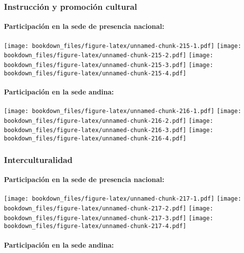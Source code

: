 \documentclass[]{article}
\let\oldparagraph\paragraph
\renewcommand{\paragraph}[1]{\oldparagraph{#1}\mbox{}}
\theoremstyle{definition}
\theoremstyle{definition}
\theoremstyle{definition}
\theoremstyle{remark}
\begin{document}
\subsubsection{Instrucción y promoción
cultural}\label{instruccion-y-promocion-cultural-1}

\paragraph{Participación en la sede de presencia
nacional:}\label{participacion-en-la-sede-de-presencia-nacional-24}

\texttt{[image: bookdown\_files/figure-latex/unnamed-chunk-215-1.pdf]}
\texttt{[image: bookdown\_files/figure-latex/unnamed-chunk-215-2.pdf]}
\texttt{[image: bookdown\_files/figure-latex/unnamed-chunk-215-3.pdf]}
\texttt{[image: bookdown\_files/figure-latex/unnamed-chunk-215-4.pdf]}

\paragraph{Participación en la sede
andina:}\label{participacion-en-la-sede-andina-24}

\texttt{[image: bookdown\_files/figure-latex/unnamed-chunk-216-1.pdf]}
\texttt{[image: bookdown\_files/figure-latex/unnamed-chunk-216-2.pdf]}
\texttt{[image: bookdown\_files/figure-latex/unnamed-chunk-216-3.pdf]}
\texttt{[image: bookdown\_files/figure-latex/unnamed-chunk-216-4.pdf]}

\subsubsection{Interculturalidad}\label{interculturalidad-1}

\paragraph{Participación en la sede de presencia
nacional:}\label{participacion-en-la-sede-de-presencia-nacional-25}

\texttt{[image: bookdown\_files/figure-latex/unnamed-chunk-217-1.pdf]}
\texttt{[image: bookdown\_files/figure-latex/unnamed-chunk-217-2.pdf]}
\texttt{[image: bookdown\_files/figure-latex/unnamed-chunk-217-3.pdf]}
\texttt{[image: bookdown\_files/figure-latex/unnamed-chunk-217-4.pdf]}

\paragraph{Participación en la sede
andina:}\label{participacion-en-la-sede-andina-25}
\end{document}
